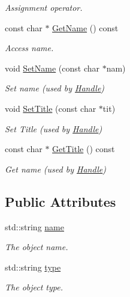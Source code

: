 \begin{DoxyCompactItemize}
\begin{DoxyCompactList}\small\item\em Assignment operator. \end{DoxyCompactList}\item 
const char $\ast$ \hyperlink{class_d_d4hep_1_1_named_object_aecaaceb326b45f3821be0600baa45192}{Get\+Name} () const
\begin{DoxyCompactList}\small\item\em Access name. \end{DoxyCompactList}\item 
void \hyperlink{class_d_d4hep_1_1_named_object_ae797352ed4559f085e6333b6394fb8ac}{Set\+Name} (const char $\ast$nam)
\begin{DoxyCompactList}\small\item\em Set name (used by \hyperlink{class_d_d4hep_1_1_handle}{Handle}) \end{DoxyCompactList}\item 
void \hyperlink{class_d_d4hep_1_1_named_object_ac0ca31db35ec2162134e5a9b92e8a0d6}{Set\+Title} (const char $\ast$tit)
\begin{DoxyCompactList}\small\item\em Set Title (used by \hyperlink{class_d_d4hep_1_1_handle}{Handle}) \end{DoxyCompactList}\item 
const char $\ast$ \hyperlink{class_d_d4hep_1_1_named_object_aabae2ba6d2686b9a172837817edc083a}{Get\+Title} () const
\begin{DoxyCompactList}\small\item\em Get name (used by \hyperlink{class_d_d4hep_1_1_handle}{Handle}) \end{DoxyCompactList}\end{DoxyCompactItemize}
\subsection*{Public Attributes}
\begin{DoxyCompactItemize}
\item 
std\+::string \hyperlink{class_d_d4hep_1_1_named_object_a4675ccdc57835ec27eef8f2799eb77a2}{name}
\begin{DoxyCompactList}\small\item\em The object name. \end{DoxyCompactList}\item 
std\+::string \hyperlink{class_d_d4hep_1_1_named_object_a8e17bb5f854b320302be44c68c39a192}{type}
\begin{DoxyCompactList}\small\item\em The object type. \end{DoxyCompactList}\end{DoxyCompactItemize}


